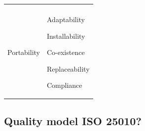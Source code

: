 \begin{table}[h!]
\begin{tabularx}{\textwidth}{X | X }
	    \\ \hline
	    \\ %
	    
	   Portability	
       
       & Adaptability
       
       Installability 
       
       Co-existence
       
       Replaceability 
       
       Compliance
        	   
	\end{tabularx}
	\label{tab:table1}
	
\end{table}


\subsection{Quality model ISO 25010? }



